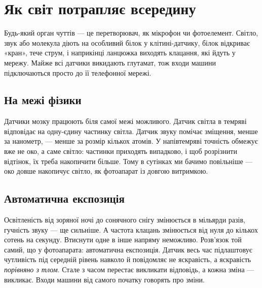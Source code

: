 \chapter{Як світ потрапляє всередину}

Будь-який орган чуттів --- це перетворювач, як мікрофон чи фотоелемент. Світло, звук або молекула діють на особливий білок у клітині-датчику, білок відкриває «кран», тече струм, і наприкінці ланцюжка виходять клацання, які йдуть у мережу. Майже всі датчики викидають глутамат, тож входи машини підключаються просто до її телефонної мережі.

\section*{На межі фізики}

Датчики мозку працюють біля самої межі можливого. Датчик світла в темряві відповідає на одну-єдину частинку світла. Датчик звуку помічає зміщення, менше за нанометр, --- менше за розмір кількох атомів. У напівтемряві точність обмежує вже не око, а саме світло: частинки приходять випадково, і щоб розрізнити відтінок, їх треба накопичити більше. Тому в сутінках ми бачимо повільніше --- око довше накопичує світло, як фотоапарат із довгою витримкою.

\section*{Автоматична експозиція}

Освітленість від зоряної ночі до сонячного снігу змінюється в мільярди разів, гучність звуку --- ще сильніше. А частота клацань змінюється від нуля до кількох сотень на секунду. Втиснути одне в інше напряму неможливо. Розв'язок той самий, що у фотоапарата: автоматична експозиція. Датчик весь час підлаштовує чутливість під середній рівень навколо й повідомляє не яскравість, а яскравість \emph{порівняно з тлом}. Стале з часом перестає викликати відповідь, а кожна зміна --- викликає. Входи машини від самого початку говорять про зміни.

